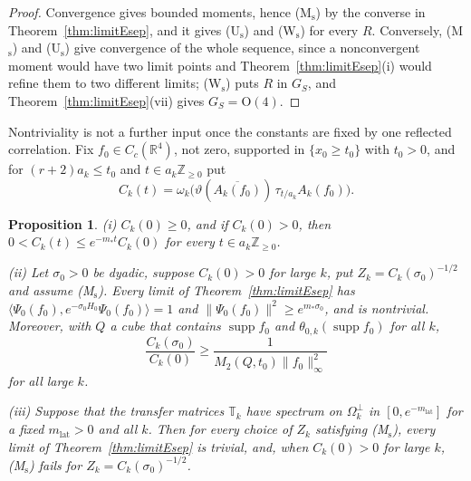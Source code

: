 \documentclass[aps,prd,twocolumn,superscriptaddress,nofootinbib,longbibliography,floatfix,amsmath,amssymb,10pt]{revtex4-2}
\newtheorem{proposition}[theorem]{Proposition}
\theoremstyle{definition}
\theoremstyle{remark}
\newcommand{\R}{\mathbb{R}}
\newcommand{\Z}{\mathbb{Z}}
\newcommand{\ip}[2]{\langle #1,#2\rangle}
\begin{document}
\begin{proof}
Convergence gives bounded moments, hence (M$_{\mathrm s}$) by the converse
in Theorem~\ref{thm:limitEsep}, and it gives (U$_{\mathrm s}$) and
(W$_{\mathrm s}$) for every $R$. Conversely, (M$_{\mathrm s}$) and
(U$_{\mathrm s}$) give convergence of the whole sequence, since a
nonconvergent moment would have two limit points and
Theorem~\ref{thm:limitEsep}(i) would refine them to two different limits;
(W$_{\mathrm s}$) puts $R$ in $G_S$, and Theorem~\ref{thm:limitEsep}(vii)
gives $G_S=\mathrm O(4)$.
\end{proof}

Nontriviality is not a further input once the constants are fixed by one
reflected correlation. Fix $f_0\in C_c(\R^4)$, not zero, supported in
$\{x_0\ge t_0\}$ with $t_0>0$, and for $(r+2)a_k\le t_0$ and $t\in a_k
\Z_{\ge0}$ put
\[
C_k(t)=\omega_k\bigl(\vartheta(\overline{A_k(f_0)})\,\tau_{t/a_k}
A_k(f_0)\bigr) .
\]

\begin{proposition}\label{prop:limitEnorm}
\textup{(i)} $C_k(0)\ge0$, and if $C_k(0)>0$, then $0<C_k(t)\le e^{-m_*t}
C_k(0)$ for every $t\in a_k\Z_{\ge0}$.

\textup{(ii)} Let $\sigma_0>0$ be dyadic, suppose $C_k(0)>0$ for large $k$,
put $Z_k=C_k(\sigma_0)^{-1/2}$ and assume \textup{(M$_{\mathrm s}$)}. Every
limit of Theorem~\textup{\ref{thm:limitEsep}} has
$\ip{\Psi_0(f_0)}{e^{-\sigma_0H_0}\Psi_0(f_0)}=1$ and $\|\Psi_0(f_0)\|^2\ge
e^{m_*\sigma_0}$, and is nontrivial. Moreover, with $Q$ a cube that contains
$\operatorname{supp}f_0$ and $\theta_{0,k}(\operatorname{supp}f_0)$ for all
$k$,
\[
\frac{C_k(\sigma_0)}{C_k(0)}\ge\frac1{M_2(Q,t_0)\|f_0\|_\infty^2}
\]
for all large $k$.

\textup{(iii)} Suppose that the transfer matrices $\mathbb T_k$ have
spectrum on $\Omega_k^\perp$ in $[0,e^{-m_{\mathrm{lat}}}]$ for a fixed $m_{\mathrm{lat}}>0$ and all
$k$. Then for every choice of $Z_k$ satisfying \textup{(M$_{\mathrm s}$)},
every limit of Theorem~\textup{\ref{thm:limitEsep}} is trivial, and, when
$C_k(0)>0$ for large $k$, \textup{(M$_{\mathrm s}$)} fails for
$Z_k=C_k(\sigma_0)^{-1/2}$.
\end{proposition}
\end{document}
